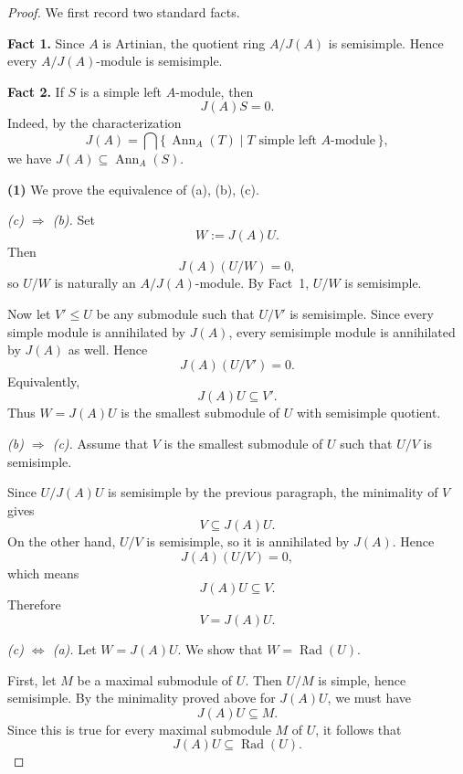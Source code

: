 \begin{proof}
    We first record two standard facts.

    \medskip

    \noindent
    \textbf{Fact 1.}
    Since $A$ is Artinian, the quotient ring $A/J(A)$ is semisimple. Hence every
    $A/J(A)$-module is semisimple.

    \medskip

    \noindent
    \textbf{Fact 2.}
    If $S$ is a simple left $A$-module, then
    \[
        J(A)S=0.
    \]
    Indeed, by the characterization
    \[
        J(A)=\bigcap \{\,\operatorname{Ann}_A(T)\mid T \text{ simple left }A\text{-module}\,\},
    \]
    we have $J(A)\subseteq \operatorname{Ann}_A(S)$.

    \bigskip

    \noindent
    \textbf{(1)} We prove the equivalence of \textup{(a)}, \textup{(b)}, \textup{(c)}.

    \medskip

    \noindent
    \textit{\textup{(c)} $\Rightarrow$ \textup{(b)}.}
    Set
    \[
        W:=J(A)U.
    \]
    Then
    \[
        J(A)(U/W)=0,
    \]
    so $U/W$ is naturally an $A/J(A)$-module. By Fact~1, $U/W$ is semisimple.

    Now let $V'\leq U$ be any submodule such that $U/V'$ is semisimple. Since every
    simple module is annihilated by $J(A)$, every semisimple module is annihilated by
    $J(A)$ as well. Hence
    \[
        J(A)(U/V')=0.
    \]
    Equivalently,
    \[
        J(A)U\subseteq V'.
    \]
    Thus $W=J(A)U$ is the smallest submodule of $U$ with semisimple quotient.

    \medskip

    \noindent
    \textit{\textup{(b)} $\Rightarrow$ \textup{(c)}.}
    Assume that $V$ is the smallest submodule of $U$ such that $U/V$ is semisimple.

    Since $U/J(A)U$ is semisimple by the previous paragraph, the minimality of $V$ gives
    \[
        V\subseteq J(A)U.
    \]
    On the other hand, $U/V$ is semisimple, so it is annihilated by $J(A)$. Hence
    \[
        J(A)(U/V)=0,
    \]
    which means
    \[
        J(A)U\subseteq V.
    \]
    Therefore
    \[
        V=J(A)U.
    \]

    \medskip

    \noindent
    \textit{\textup{(c)} $\Leftrightarrow$ \textup{(a)}.}
    Let $W=J(A)U$. We show that $W=\operatorname{Rad}(U)$.

    First, let $M$ be a maximal submodule of $U$. Then $U/M$ is simple, hence semisimple.
    By the minimality proved above for $J(A)U$, we must have
    \[
        J(A)U\subseteq M.
    \]
    Since this is true for every maximal submodule $M$ of $U$, it follows that
    \[
        J(A)U\subseteq \operatorname{Rad}(U).
    \]


\end{proof}
